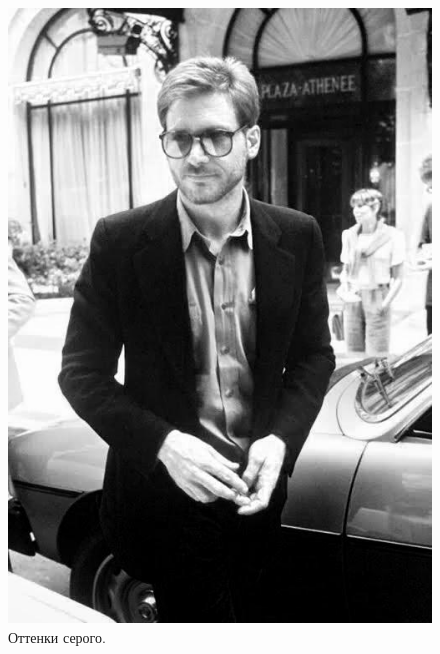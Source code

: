 \documentclass[a4paper,12pt]{article}
\begin{document}
\begin{figure}[h]
\begin{minipage}[h]{0.2\linewidth}
\includegraphics[width=1\linewidth]{Pic_Grey}
Оттенки серого.
\end{minipage}
$\mspace{30mu}$
\begin{minipage}[h]{0.2\linewidth}

\end{minipage}
\end{figure}
\end{document}
